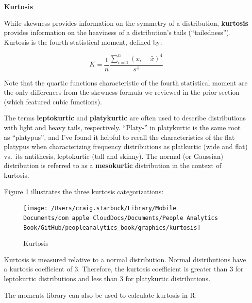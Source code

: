 \documentclass[
]{book}
\newenvironment{Shaded}{\begin{snugshade}}{\end{snugshade}}
\newcommand{\CommentTok}[1]{\textcolor[rgb]{0.56,0.35,0.01}{\textit{#1}}}
\newcommand{\DecValTok}[1]{\textcolor[rgb]{0.00,0.00,0.81}{#1}}
\newcommand{\FunctionTok}[1]{\textcolor[rgb]{0.00,0.00,0.00}{#1}}
\newcommand{\NormalTok}[1]{#1}
\newcommand{\SpecialCharTok}[1]{\textcolor[rgb]{0.00,0.00,0.00}{#1}}
\begin{document}
\textbf{Kurtosis}

While skewness provides information on the symmetry of a distribution, \textbf{kurtosis} provides information on the heaviness of a distribution's tails (``tailedness''). Kurtosis is the fourth statistical moment, defined by:

\[ K = \frac{1}{n} \frac{\displaystyle\sum_{i=1}^{n} (x_i-\bar{x})^4}{s^4} \]

Note that the quartic functions characteristic of the fourth statistical moment are the only differences from the skewness formula we reviewed in the prior section (which featured cubic functions).

The terms \textbf{leptokurtic} and \textbf{platykurtic} are often used to describe distributions with light and heavy tails, respectively. ``Platy-'' in platykurtic is the same root as ``platypus'', and I've found it helpful to recall the characteristics of the flat platypus when characterizing frequency distributions as platkurtic (wide and flat) vs.~its antithesis, leptokurtic (tall and skinny). The normal (or Gaussian) distribution is referred to as a \textbf{mesokurtic} distribution in the context of kurtosis.

Figure \ref{fig:kurtosis} illustrates the three kurtosis categorizations:

\begin{figure}

{\centering \texttt{[image: /Users/craig.starbuck/Library/Mobile Documents/com~apple~CloudDocs/Documents/People Analytics Book/GitHub/peopleanalytics\_book/graphics/kurtosis]} 

}

\caption{Kurtosis}\label{fig:kurtosis}
\end{figure}

Kurtosis is measured relative to a normal distribution. Normal distributions have a kurtosis coefficient of 3. Therefore, the kurtosis coefficient is greater than 3 for leptokurtic distributions and less than 3 for platykurtic distributions.

The moments library can also be used to calculate kurtosis in R:

\begin{Shaded}
\end{Shaded}
\end{document}
